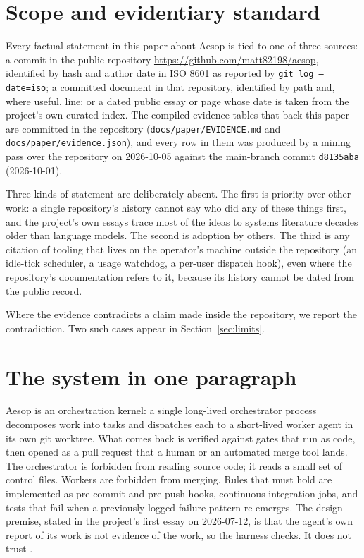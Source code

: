 \documentclass[11pt]{article}
\newcommand{\sha}[1]{\texttt{\small #1}}
\newcommand{\file}[1]{\texttt{\small #1}}
\begin{document}
\section{Scope and evidentiary standard}

Every factual statement in this paper about Aesop is tied to one of three sources: a commit in the public repository \url{https://github.com/matt82198/aesop}, identified by hash and author date in ISO 8601 as reported by \texttt{git log --date=iso}; a committed document in that repository, identified by path and, where useful, line; or a dated public essay or page whose date is taken from the project's own curated index. The compiled evidence tables that back this paper are committed in the repository (\file{docs/paper/EVIDENCE.md} and \file{docs/paper/evidence.json}), and every row in them was produced by a mining pass over the repository on 2026-10-05 against the main-branch commit \sha{d8135aba} (2026-10-01).

Three kinds of statement are deliberately absent. The first is priority over other work: a single repository's history cannot say who did any of these things first, and the project's own essays trace most of the ideas to systems literature decades older than language models. The second is adoption by others. The third is any citation of tooling that lives on the operator's machine outside the repository (an idle-tick scheduler, a usage watchdog, a per-user dispatch hook), even where the repository's documentation refers to it, because its history cannot be dated from the public record.

Where the evidence contradicts a claim made inside the repository, we report the contradiction. Two such cases appear in Section~\ref{sec:limits}.

\section{The system in one paragraph}

Aesop is an orchestration kernel: a single long-lived orchestrator process decomposes work into tasks and dispatches each to a short-lived worker agent in its own git worktree. What comes back is verified against gates that run as code, then opened as a pull request that a human or an automated merge tool lands. The orchestrator is forbidden from reading source code; it reads a small set of control files. Workers are forbidden from merging. Rules that must hold are implemented as pre-commit and pre-push hooks, continuous-integration jobs, and tests that fail when a previously logged failure pattern re-emerges. The design premise, stated in the project's first essay on 2026-07-12, is that the agent's own report of its work is not evidence of the work, so the harness checks. It does not trust \cite{hypothesis}.
\end{document}
